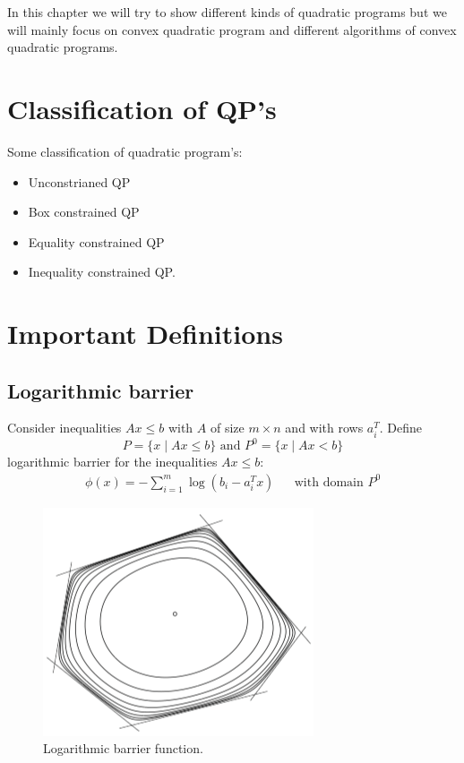 In this chapter we will try to show different kinds of quadratic programs but we will mainly focus on convex quadratic program and different algorithms of convex quadratic programs.

\section{Classification of QP's}

Some classification of quadratic program's:
\begin{itemize}
	\item Unconstrianed QP
	\item Box constrained QP
	\item Equality constrained QP
	\item Inequality constrained QP.
\end{itemize}

\section*{Important Definitions}
\subsection*{Logarithmic barrier}
Consider inequalities $Ax \leqslant b$ with $A$ of size $m\times n$ and with rows $a_i^T$. Define
\begin{equation*}
P=\lbrace x \mid Ax \leqslant b \rbrace \text{ and } P^0=\lbrace x \mid Ax < b \rbrace
\end{equation*}
logarithmic barrier for the inequalities $Ax\leqslant b$:
\begin{equation*}
\begin{aligned}
	\phi(x) = - \sum_{i=1}^{m}\log(b_i - a_i^Tx) & & \text{with domain } P^0
\end{aligned}	
\end{equation*}
\begin{figure}[h]
\centering
\includegraphics{Figures/logarithmic_barrier.png}
\decoRule
\caption[hypercube]{Logarithmic barrier function.}
\label{fig:logarithmic_barrier}
\end{figure}


